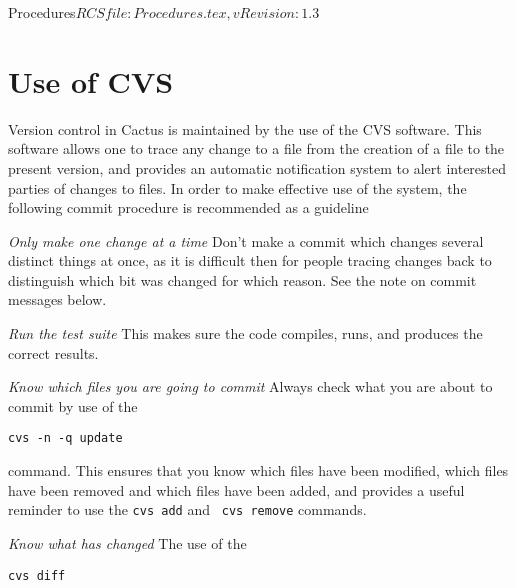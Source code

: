 
\begin{cactuspart}{2}{Procedures}{$RCSfile: Procedures.tex,v $}{$Revision: 1.3 $}
\renewcommand{\thepage}{\Alph{part}\arabic{page}}


\chapter{Use of CVS} 

Version control in Cactus is maintained by the use of the CVS
software.  This software allows one to trace any change to a file from 
the creation of a file to the present version, and provides an
automatic notification system to alert interested parties of changes
to files.  In order to make effective use of the system, the following 
commit procedure is recommended as a guideline

\begin{Lentry}
\item[{\em Only make one change at a time}]
Don't make a commit which changes several distinct things at once, as
it is difficult then for people tracing changes back to distinguish
which bit was changed for which reason.  See the note on commit
messages below.
\item[{\em Run the test suite}]
This makes sure the code compiles, runs, and produces the correct results. 
\item[{\em Know which files you are going to commit}]
Always check what you are about to commit by use of the

{\tt cvs -n -q update} 

command.  This ensures that you know which files have been modified,
which files have been removed and which files have been added, and
provides a useful reminder to use the {\tt \verb.cvs add.} and {\tt
\verb.cvs remove.} commands.
\item[{\em Know what has changed}]
The use of the

{\tt cvs diff} 


\end{Lentry}
\end{cactuspart}

